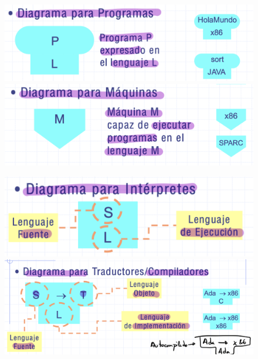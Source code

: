 \documentclass[12pt, twoside, openright]{report} %
\begin{document}
\begin{figure}[H]
	{\includegraphics[scale=.17]{Untitled 16.png}
	\includegraphics[scale=.17]{Untitled 17.png}}
\end{figure}

\begin{figure}[H]
	{\includegraphics[scale=.2]{Untitled 18.png}
	\includegraphics[scale=.13]{Untitled 19.png}}
\end{figure}
\end{document}
